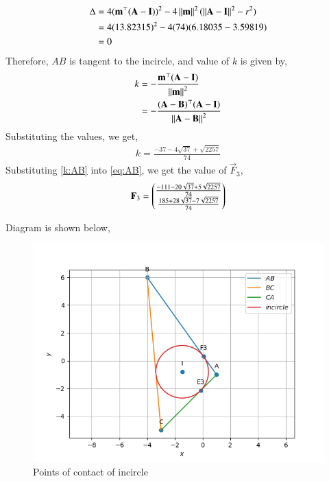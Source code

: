\documentclass[journal,12pt,twocolumn]{IEEEtran}
\theoremstyle{remark}
\begin{document}
\begin{enumerate}
		\begin{align}
			\Delta &= 4(\mathbf{m}^{\top}(\mathbf{A}-\mathbf{I}))^2 - 4\left\lVert\mathbf{m}\right\rVert^2(\left\lVert\mathbf{A}-\mathbf{I}\right\rVert^2 - r^2)\\	
			&= 4(13.82315)^2 - 4(74)(6.18035-3.59819) \\
			&= 0
		\end{align}
		Therefore, $AB$ is tangent to the incircle, and value of $k$ is given by, 
		\begin{align}
			k &= -\frac{\mathbf{m}^{\top}(\mathbf{A} - \mathbf{I})}{\left\lVert\mathbf{m}\right\rVert^2} \\
			&= -\frac{(\mathbf{A}-\mathbf{B})^{\top}(\mathbf{A} - \mathbf{I})}{\left\lVert\mathbf{A}-\mathbf{B}\right\rVert^2}
		\end{align}
		Substituting the values, we get,
		\begin{align}
			k = \frac{-37-4\sqrt{37}+\sqrt{2257}}{74} \label{k:AB} 
		\end{align}
		Substituting \eqref{k:AB} into \eqref{eq:AB}, we get the value of $\vec{F}_3$,
		\begin{align}
			\mathbf{F}_3 = \begin{pmatrix}
				\frac{-111-20\sqrt{37}+5\sqrt{2257}}{74}\\ 
				\frac{185+28\sqrt{37}-7\sqrt{2257}}{74}
			\end{pmatrix}
		\end{align}
\end{enumerate}
Diagram is shown below,
\begin{figure}[h]
	\centering
	\includegraphics[width=\columnwidth]{./figs/Diagram.png}
	\caption{Points of contact of incircle}
	\label{fig:Incircle}
\end{figure}
\end{document}
